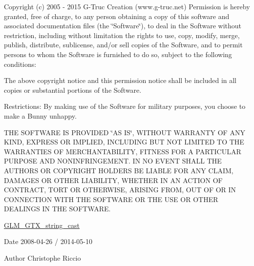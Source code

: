 Copyright (c) 2005 -\/ 2015 G-\/\-Truc Creation (www.\-g-\/truc.\-net) Permission is hereby granted, free of charge, to any person obtaining a copy of this software and associated documentation files (the \char`\"{}\-Software\char`\"{}), to deal in the Software without restriction, including without limitation the rights to use, copy, modify, merge, publish, distribute, sublicense, and/or sell copies of the Software, and to permit persons to whom the Software is furnished to do so, subject to the following conditions\-:

The above copyright notice and this permission notice shall be included in all copies or substantial portions of the Software.

Restrictions\-: By making use of the Software for military purposes, you choose to make a Bunny unhappy.

T\-H\-E S\-O\-F\-T\-W\-A\-R\-E I\-S P\-R\-O\-V\-I\-D\-E\-D \char`\"{}\-A\-S I\-S\char`\"{}, W\-I\-T\-H\-O\-U\-T W\-A\-R\-R\-A\-N\-T\-Y O\-F A\-N\-Y K\-I\-N\-D, E\-X\-P\-R\-E\-S\-S O\-R I\-M\-P\-L\-I\-E\-D, I\-N\-C\-L\-U\-D\-I\-N\-G B\-U\-T N\-O\-T L\-I\-M\-I\-T\-E\-D T\-O T\-H\-E W\-A\-R\-R\-A\-N\-T\-I\-E\-S O\-F M\-E\-R\-C\-H\-A\-N\-T\-A\-B\-I\-L\-I\-T\-Y, F\-I\-T\-N\-E\-S\-S F\-O\-R A P\-A\-R\-T\-I\-C\-U\-L\-A\-R P\-U\-R\-P\-O\-S\-E A\-N\-D N\-O\-N\-I\-N\-F\-R\-I\-N\-G\-E\-M\-E\-N\-T. I\-N N\-O E\-V\-E\-N\-T S\-H\-A\-L\-L T\-H\-E A\-U\-T\-H\-O\-R\-S O\-R C\-O\-P\-Y\-R\-I\-G\-H\-T H\-O\-L\-D\-E\-R\-S B\-E L\-I\-A\-B\-L\-E F\-O\-R A\-N\-Y C\-L\-A\-I\-M, D\-A\-M\-A\-G\-E\-S O\-R O\-T\-H\-E\-R L\-I\-A\-B\-I\-L\-I\-T\-Y, W\-H\-E\-T\-H\-E\-R I\-N A\-N A\-C\-T\-I\-O\-N O\-F C\-O\-N\-T\-R\-A\-C\-T, T\-O\-R\-T O\-R O\-T\-H\-E\-R\-W\-I\-S\-E, A\-R\-I\-S\-I\-N\-G F\-R\-O\-M, O\-U\-T O\-F O\-R I\-N C\-O\-N\-N\-E\-C\-T\-I\-O\-N W\-I\-T\-H T\-H\-E S\-O\-F\-T\-W\-A\-R\-E O\-R T\-H\-E U\-S\-E O\-R O\-T\-H\-E\-R D\-E\-A\-L\-I\-N\-G\-S I\-N T\-H\-E S\-O\-F\-T\-W\-A\-R\-E.

\hyperlink{group__gtx__string__cast}{G\-L\-M\-\_\-\-G\-T\-X\-\_\-string\-\_\-cast}

\begin{DoxyDate}{Date}
2008-\/04-\/26 / 2014-\/05-\/10 
\end{DoxyDate}
\begin{DoxyAuthor}{Author}
Christophe Riccio 
\end{DoxyAuthor}
